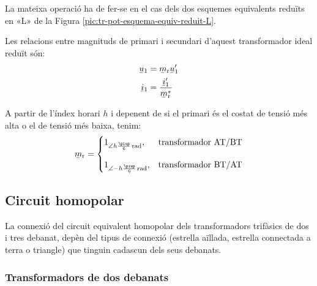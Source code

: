 \break
\begin{center}
    
    \label{fig:esq-reduit-T-complex}
\end{center}

La mateixa operació ha de fer-se en el cas dels dos esquemes equivalents reduïts en «L» de la Figura \vref{pic:tr-pot-esquema-equiv-reduit-L}.

Les relacions entre magnituds de primari i secundari d'aquest transformador ideal reduït són:
\begin{subequations}
\begin{align}
    \cmplx{u}_1 &= \cmplx{m}\ped{r}\cmplx{u}'_1 \label{eq:UmU-reduit}\\
    \cmplx{i}_1 &= \frac{\cmplx{i}'_1}{\cmplx{m}^*\ped{r}} \label{eq:ImI-reduit}
\end{align}
\end{subequations}

A partir de l'índex horari $h$ i depenent de si el primari és el costat de tensió més alta o el de tensió més baixa, tenim:
\begin{equation}
\cmplx{m}\ped{r} = \begin{cases}
      1_{\angle h\frac{\piup}{6}\si{\,rad}}, & \text{transformador AT/BT}\\[2.7ex]
      1_{\angle -h\frac{\piup}{6}\si{\,rad}}, & \text{transformador BT/AT}
\end{cases}
\label{eq:rel-transf-cmplx-reduit}
\end{equation}


\subsection{Circuit homopolar}\label{sec:circuit_homopolar}

La connexió del circuit equivalent homopolar dels transformadors trifàsics de dos i tres debanat, depèn del tipus de connexió (estrella aïllada, estrella connectada a terra o triangle) que tinguin cadascun dels seus debanats.

\subsubsection{Transformadors de dos debanats}\label{sec:cir-hom-2-deb}

